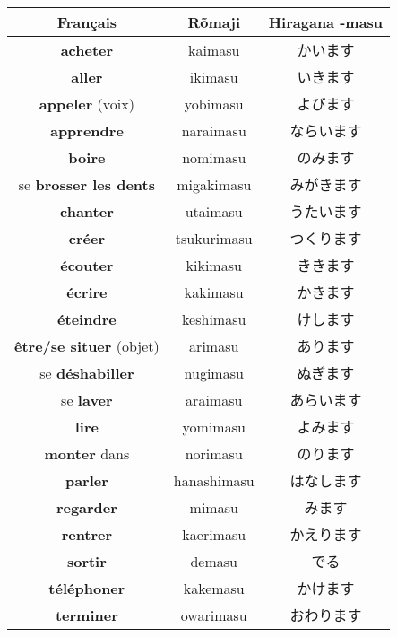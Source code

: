 \documentclass[11pt]{report}
\newenvironment{Japanese}{%
\CJKfamily{min}%
\CJKtilde  
\CJKnospace}{}
\begin{document}
\begin{CJK}{UTF8}{}  
\begin{Japanese}
	\begin{center}
		\begin{tabular}{|c|c|c|}
				\hline
				\textbf{Français} & \textbf{Rõmaji} & \textbf{Hiragana -masu} \\
				\hline
				\textbf{acheter} & kaimasu & かいます \\
				\hline
				\textbf{aller} & ikimasu & いきます \\
				\hline
				\textbf{appeler} (voix) & yobimasu & よびます \\
				\hline
				\textbf{apprendre} & naraimasu & ならいます \\
				\hline
				\textbf{boire} & nomimasu & のみます \\
				\hline
				se \textbf{brosser les dents} & migakimasu & みがきます \\
				\hline
				\textbf{chanter} & utaimasu & うたいます \\
				\hline
				\textbf{créer} & tsukurimasu & つくります \\
				\hline
				\textbf{écouter} & kikimasu & ききます \\
				\hline
				\textbf{écrire} & kakimasu & かきます \\
				\hline
				\textbf{éteindre} & keshimasu & けします \\
				\hline
				\textbf{être/se situer} (objet) & arimasu & あります \\
				\hline
				se \textbf{déshabiller} & nugimasu & ぬぎます \\
				\hline
				se \textbf{laver} & araimasu & あらいます \\
				\hline
				\textbf{lire} & yomimasu & よみます \\
				\hline
				\textbf{monter} dans & norimasu & のります \\
				\hline
				\textbf{parler} & hanashimasu & はなします \\
				\hline
				\textbf{regarder} & mimasu & みます \\
				\hline
				\textbf{rentrer} & kaerimasu & かえります \\
				\hline
				\textbf{sortir} & demasu & でる \\
				\hline
				\textbf{téléphoner} & kakemasu & かけます \\
				\hline
				\textbf{terminer} & owarimasu & おわります \\
				\hline
			\end{tabular}
	\end{center}
\end{Japanese}  
\end{CJK}
\end{document}
